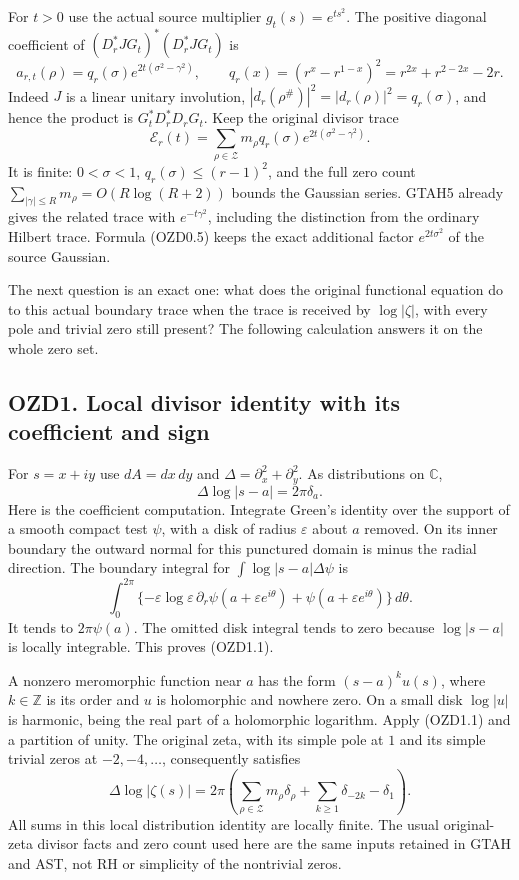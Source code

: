 For \(t>0\) use the actual source multiplier \(g_t(s)=e^{ts^2}\). The
positive diagonal coefficient of \((D_r^*JG_t)^*(D_r^*JG_t)\) is \[
a_{r,t}(\rho)=q_r(\sigma)e^{2t(\sigma^2-\gamma^2)},\qquad
q_r(x)=(r^x-r^{1-x})^2=r^{2x}+r^{2-2x}-2r.
\tag{OZD0.4}
\] Indeed \(J\) is a linear unitary involution,
\(|d_r(\rho^\#)|^2=|d_r(\rho)|^2=q_r(\sigma)\), and hence the product is
\(G_t^*D_r^*D_rG_t\). Keep the original divisor trace \[
\mathcal E_r(t)=\sum_{\rho\in\mathscr Z}m_\rho q_r(\sigma)e^{2t(\sigma^2-\gamma^2)}.
\tag{OZD0.5}
\] It is finite: \(0<\sigma<1\), \(q_r(\sigma)\le(r-1)^2\), and the full
zero count \(\sum_{|\gamma|\le R}m_\rho=O(R\log(R+2))\) bounds the
Gaussian series. GTAH5 already gives the related trace with
\(e^{-t\gamma^2}\), including the distinction from the ordinary Hilbert
trace. Formula (OZD0.5) keeps the exact additional factor
\(e^{2t\sigma^2}\) of the source Gaussian.

The next question is an exact one: what does the original functional
equation do to this actual boundary trace when the trace is received by
\(\log|\zeta|\), with every pole and trivial zero still present? The
following calculation answers it on the whole zero set.

\subsection{OZD1. Local divisor identity with its coefficient and
sign}\label{ozd1.-local-divisor-identity-with-its-coefficient-and-sign}

For \(s=x+iy\) use \(dA=dx\,dy\) and
\(\Delta=\partial_x^2+\partial_y^2\). As distributions on \(\mathbb C\),
\[
\Delta\log|s-a|=2\pi\delta_a.
\tag{OZD1.1}
\] Here is the coefficient computation. Integrate Green's identity over
the support of a smooth compact test \(\psi\), with a disk of radius
\(\varepsilon\) about \(a\) removed. On its inner boundary the outward
normal for this punctured domain is minus the radial direction. The
boundary integral for \(\int\log|s-a|\Delta\psi\) is \[
\int_0^{2\pi}\{-\varepsilon\log\varepsilon\,\partial_r\psi(a+\varepsilon e^{i\theta})
+\psi(a+\varepsilon e^{i\theta})\}\,d\theta.
\] It tends to \(2\pi\psi(a)\). The omitted disk integral tends to zero
because \(\log|s-a|\) is locally integrable. This proves (OZD1.1).

A nonzero meromorphic function near \(a\) has the form \((s-a)^k u(s)\),
where \(k\in\mathbb Z\) is its order and \(u\) is holomorphic and
nowhere zero. On a small disk \(\log|u|\) is harmonic, being the real
part of a holomorphic logarithm. Apply (OZD1.1) and a partition of
unity. The original zeta, with its simple pole at \(1\) and its simple
trivial zeros at \(-2,-4,\ldots\), consequently satisfies \[
\boxed{\Delta\log|\zeta(s)|
=2\pi\left(\sum_{\rho\in\mathscr Z}m_\rho\delta_\rho
+\sum_{k\ge1}\delta_{-2k}-\delta_1\right).}
\tag{OZD1.2}
\] All sums in this local distribution identity are locally finite. The
usual original-zeta divisor facts and zero count used here are the same
inputs retained in GTAH and AST, not RH or simplicity of the nontrivial
zeros.

